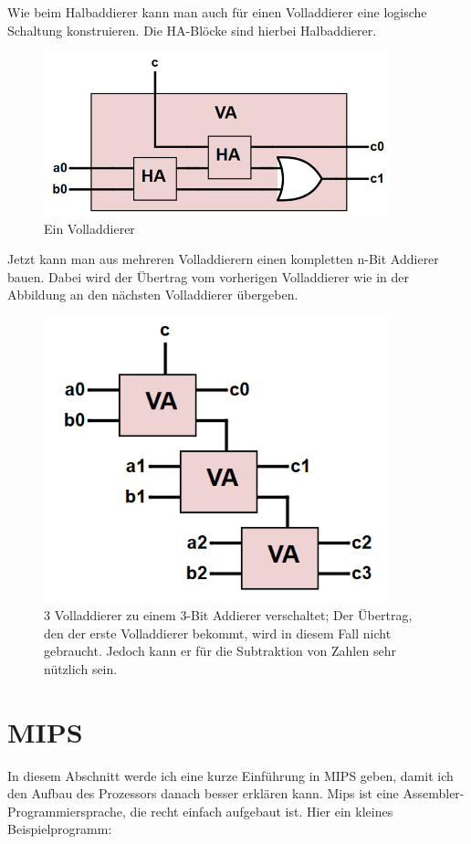 \documentclass[12pt, a4paper]{article}
\begin{document}
Wie beim Halbaddierer kann man auch für einen Volladdierer eine logische Schaltung konstruieren. Die HA-Blöcke sind hierbei Halbaddierer.

\begin{figure}[H]
	\begin{center}
		\includegraphics [width=10cm]{Volladdierer.png}
	\end{center}
	\caption{Ein Volladdierer}
\end{figure}

Jetzt kann man aus mehreren Volladdierern einen kompletten n-Bit Addierer bauen. Dabei wird der Übertrag vom vorherigen Volladdierer wie in der Abbildung an den nächsten Volladdierer übergeben.

\begin{figure}[H]
	\begin{center}
		\includegraphics [width=10cm]{VolladdiererHintereinander.png}
	\end{center}
	\caption{3 Volladdierer zu einem 3-Bit Addierer verschaltet; Der Übertrag, den der erste Volladdierer bekommt, wird in diesem Fall nicht gebraucht. Jedoch kann er für die Subtraktion von Zahlen sehr nützlich sein.}
\end{figure}


\section{MIPS}
In diesem Abschnitt werde ich eine kurze Einführung in MIPS geben, damit ich den Aufbau des Prozessors danach besser erklären kann. Mips ist eine Assembler-Programmiersprache, die recht einfach aufgebaut ist. Hier ein kleines Beispielprogramm:
\end{document}
